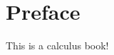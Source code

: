 \documentclass[../book/calcnotes.tex]{subfiles}
\begin{document}
\chapter{Preface}

This is a calculus book!
\end{document}
